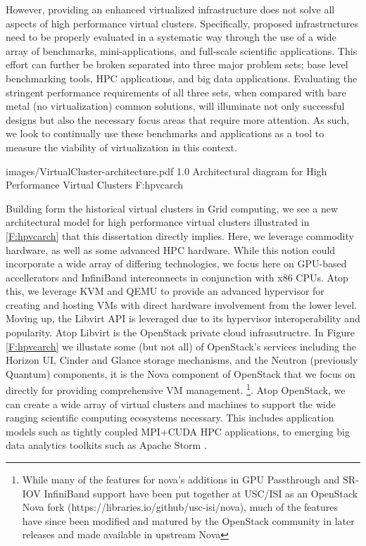However, providing an enhanced virtualized infrastructure does not solve all aspects of high performance virtual clusters. Specifically, proposed infrastructures need to be properly evaluated in a systematic way through the use of a wide array of benchmarks, mini-applications, and full-scale scientific applications. This effort can further be broken separated into three major problem sets; base level benchmarking tools, HPC applications, and big data applications. Evaluating the stringent performance requirements of all three sets, when compared with bare metal (no virtualization) common solutions, will illuminate not only successful designs but also the necessary focus areas that require more attention.  As such, we look to continually use these benchmarks and applications as a tool to measure the viability of virtualization in this context. 

  {images/VirtualCluster-architecture.pdf}
  {1.0}
  {Architectural diagram for High Performance Virtual Clusters}
  {F:hpvcarch}

Building form the historical virtual clusters in Grid computing, we see a new architectural model for high performance virtual clusters illustrated in \ref{F:hpvcarch} that this dissertation directly implies.  Here, we leverage commodity hardware, as well as some advanced HPC hardware. While this notion could incorporate a wide array of differing technologies, we focus here on GPU-based accellerators and InfiniBand interconnects in conjunction with x86 CPUs. Atop this, we leverage KVM and QEMU to provide an advanced hypervisor for creating and hosting VMs with direct hardware involvement from the lower level. Moving up, the Libvirt API is leveraged due to its hypervisor interoperability and popularity. Atop Libvirt is the OpenStack private cloud infrasutructre. In Figure \ref{F:hpvcarch} we illustate some (but not all) of OpenStack's services including the Horizon UI, Cinder and Glance storage mechanisms, and the Neutron (previously Quantum) components, it is the Nova component of OpenStack that we focus on directly for providing comprehensive VM management.
\footnote{While many of the features for nova's additions in GPU Passthrough and SR-IOV InfiniBand support have been put together at USC/ISI as an OpenStack Nova fork (https://libraries.io/github/usc-isi/nova), much of the features have since been modified and matured by the OpenStack community in later releases and made available in upstream Nova }. Atop OpenStack, we can create a wide array of virtual clusters and machines to support the wide ranging scientific computing ecosystems necessary. This includes application models such as tightly coupled MPI+CUDA HPC applications, to emerging big data analytics toolkits such as Apache Storm \cite{kamburugamuve2016streaming}. 

